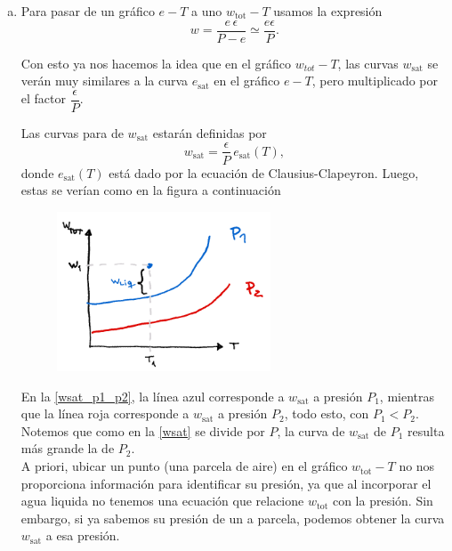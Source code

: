 \documentclass[../main.tex]{subfiles}
\begin{document}
\begin{enumerate}[a)]
    \item Para pasar de un gráfico $e-T$ a uno $w_\text{tot}- T$ usamos la expresión
\begin{equation}
    w = \frac{e\,\epsilon}{P - e} \simeq \frac{e\epsilon}{P} \label{we}
.\end{equation}

Con esto ya nos hacemos la idea que en el gráfico $w_{tot} - T$, las curvas $w_\text{sat}$ se verán muy similares a la curva $e_\text{sat}$ en el gráfico $e - T$, pero multiplicado por el factor $\dfrac{\epsilon}{P}$. 

    Las curvas para de $w_\text{sat}$ estarán definidas por 
\begin{equation}
    w_\text{sat} = \frac{\epsilon}{P}\,e_\text{sat}(T) \label{wsat}
,\end{equation}
donde $e_\text{sat}(T)$ está dado por la ecuación de Clausius-Clapeyron. Luego, estas se verían como en la figura a continuación 
\begin{figure}[h]
    \centering
            \includegraphics[width=0.6\textwidth]{img/f1}
            \label{wsat_p1_p2}
        \end{figure}
En la \autoref{wsat_p1_p2}, la línea azul corresponde a $w_\text{sat}$ a presión $P_1$, mientras que la línea roja corresponde a $w_\text{sat}$ a presión $P_2$, todo esto, con $P_1 < P_2$. Notemos que como en la \autoref{wsat} se divide por $P$, la curva de $w_\text{sat}$ de $P_1$ resulta más grande la de $P_2$.\\

A priori, ubicar un punto (una parcela de aire) en el gráfico $w_\text{tot} - T$ no nos proporciona información para identificar su presión, ya que al incorporar el agua liquida no tenemos una ecuación que relacione $w_\text{tot}$ con la presión. Sin embargo, si ya sabemos su presión de un a parcela, podemos obtener la curva $w_\text{sat}$ a esa presión. 


\end{enumerate}
\end{document}
